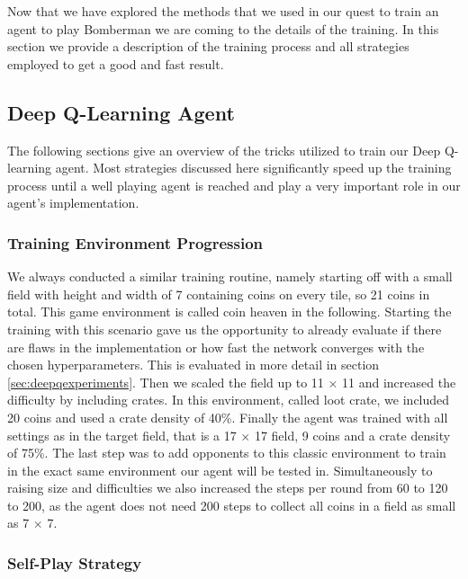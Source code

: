 
Now that we have explored the methods that we used in our quest to train an agent to play Bomberman we are coming to the details of the training. In this section we provide a description of the training process and all strategies employed to get a good and fast result.

\subsection{Deep Q-Learning Agent} \label{sec:deepqtraining}

The following sections give an overview of the tricks utilized to train our Deep Q-learning agent. Most strategies discussed here significantly speed up the training process until a well playing agent is reached and play a very important role in our agent's implementation.

\subsubsection{Training Environment Progression}

We always conducted a similar training routine, namely starting off with a small field with height and width of 7 containing coins on every tile, so 21 coins in total. This game environment is called coin heaven in the following. Starting the training with this scenario gave us the opportunity to already evaluate if there are flaws in the implementation or how fast the network converges with the chosen hyperparameters. This is evaluated in more detail in section \ref{sec:deepqexperiments}. Then we scaled the field up to 11 $\times$ 11 and increased the difficulty by including crates. In this environment, called loot crate, we included 20 coins and used a crate density of 40\%. Finally the agent was trained with all settings as in the target field, that is a 17 $\times$ 17 field, 9 coins and a crate density of 75\%. The last step was to add opponents to this classic environment to train in the exact same environment our agent will be tested in. Simultaneously to raising size and difficulties we also increased the steps per round from 60 to 120 to 200, as the agent does not need 200 steps to collect all coins in a field as small as 7 $\times$ 7.

\subsubsection{Self-Play Strategy}

